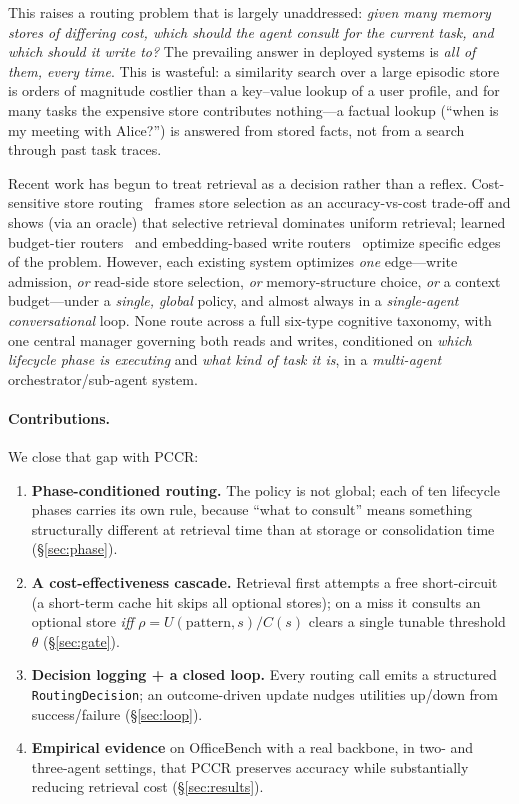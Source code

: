 \documentclass[10pt,twocolumn]{article}
\begin{document}
This raises a routing problem that is largely unaddressed: \emph{given many
memory stores of differing cost, which should the agent consult for the current
task, and which should it write to?} The prevailing answer in deployed systems
is \emph{all of them, every time}. This is wasteful: a similarity search over a
large episodic store is orders of magnitude costlier than a key--value lookup of
a user profile, and for many tasks the expensive store contributes
nothing---a factual lookup (``when is my meeting with Alice?'') is answered from
stored facts, not from a search through past task traces.

Recent work has begun to treat retrieval as a decision rather than a reflex.
Cost-sensitive store routing~\cite{pocket} frames store selection as an
accuracy-vs-cost trade-off and shows (via an oracle) that selective retrieval
dominates uniform retrieval; learned budget-tier routers~\cite{budgetmem} and
embedding-based write routers~\cite{memrouter} optimize specific edges of the
problem. However, each existing system optimizes \emph{one} edge---write
admission, \emph{or} read-side store selection, \emph{or} memory-structure
choice, \emph{or} a context budget---under a \emph{single, global} policy, and
almost always in a \emph{single-agent conversational} loop. None route across a
full six-type cognitive taxonomy, with one central manager governing both reads
and writes, conditioned on \emph{which lifecycle phase is executing} and
\emph{what kind of task it is}, in a \emph{multi-agent} orchestrator/sub-agent
system.

\paragraph{Contributions.} We close that gap with PCCR:
\begin{enumerate}\itemsep1pt
\item \textbf{Phase-conditioned routing.} The policy is not global; each of ten
lifecycle phases carries its own rule, because ``what to consult'' means
something structurally different at retrieval time than at storage or
consolidation time (\S\ref{sec:phase}).
\item \textbf{A cost-effectiveness cascade.} Retrieval first attempts a free
short-circuit (a short-term cache hit skips all optional stores); on a miss it
consults an optional store \emph{iff} $\rho = U(\text{pattern},s)/C(s)$ clears a
single tunable threshold $\theta$ (\S\ref{sec:gate}).
\item \textbf{Decision logging + a closed loop.} Every routing call emits a
structured \texttt{RoutingDecision}; an outcome-driven update nudges utilities
up/down from success/failure (\S\ref{sec:loop}).
\item \textbf{Empirical evidence} on OfficeBench with a real backbone, in two-
and three-agent settings, that PCCR preserves accuracy while substantially
reducing retrieval cost (\S\ref{sec:results}).
\end{enumerate}
\end{document}
